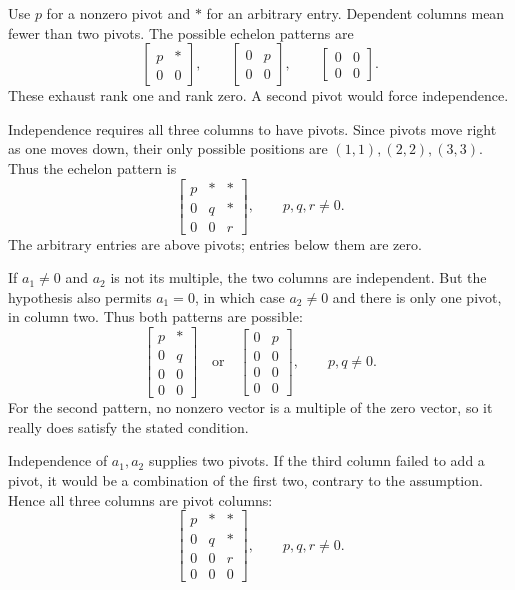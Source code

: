 Use $p$ for a nonzero pivot and $*$ for an arbitrary entry. Dependent
columns mean fewer than two pivots. The possible echelon patterns are
\[
 \begin{bmatrix}p&*\\0&0\end{bmatrix},\qquad
 \begin{bmatrix}0&p\\0&0\end{bmatrix},\qquad
 \begin{bmatrix}0&0\\0&0\end{bmatrix}.
\]
These exhaust rank one and rank zero. A second pivot would force independence.

Independence requires all three columns to have pivots. Since pivots
move right as one moves down, their only possible positions are
$(1,1),(2,2),(3,3)$. Thus the echelon pattern is
\[
 \begin{bmatrix}p&*&*\\0&q&*\\0&0&r\end{bmatrix},\qquad p,q,r\ne0.
\]
The arbitrary entries are above pivots; entries below them are zero.

If $a_1\ne0$ and $a_2$ is not its multiple, the two columns are
independent. But the hypothesis also permits $a_1=0$, in which case
$a_2\ne0$ and there is only one pivot, in column two. Thus both patterns
are possible:
\[
 \begin{bmatrix}p&*\\0&q\\0&0\\0&0\end{bmatrix}
 \quad\text{or}\quad
 \begin{bmatrix}0&p\\0&0\\0&0\\0&0\end{bmatrix},
 \qquad p,q\ne0.
\]
For the second pattern, no nonzero vector is a multiple of the zero vector,
so it really does satisfy the stated condition.

Independence of $a_1,a_2$ supplies two pivots. If the third column
failed to add a pivot, it would be a combination of the first two,
contrary to the assumption. Hence all three columns are pivot columns:
\[
 \begin{bmatrix}p&*&*\\0&q&*\\0&0&r\\0&0&0\end{bmatrix},
 \qquad p,q,r\ne0.
\]

